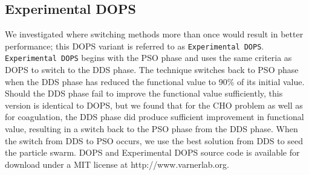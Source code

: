 \documentclass{bmcart}
\begin{document}
\subsection*{Experimental DOPS}
We investigated where switching methods more than once would result in better performance; this DOPS variant is referred to as \texttt{Experimental~DOPS}.
\texttt{Experimental~DOPS} begins with the PSO phase and uses the same criteria as DOPS to switch to the DDS phase. The technique switches back to PSO phase when the DDS phase has reduced the functional value to 90\% of its initial value.
Should the DDS phase fail to improve the functional value sufficiently, this version is identical to DOPS, but we found that for the CHO problem as well as for coagulation, the DDS phase did produce sufficient improvement in functional value, resulting in a switch back to the PSO phase from the DDS phase. When the switch from DDS to PSO occurs, we use the best solution from DDS to seed the particle swarm.
DOPS and Experimental DOPS source code is available for download under a MIT license at http://www.varnerlab.org.




\end{document}
